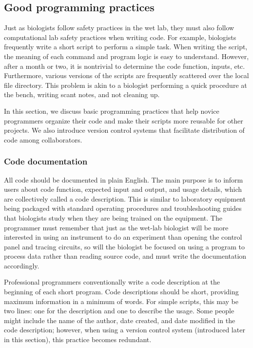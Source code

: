 \documentclass[ChapterTOCs,krantz2]{krantz} %
\begin{document}
\subsection{Good programming practices}

Just as biologists follow safety practices in the wet lab, they
must also follow computational lab safety practices when writing code.
For example, biologists frequently write a short script to perform a 
simple task. When writing the script, the 
meaning of each command and program logic 
is easy to understand.  However, after a month or two, it is 
nontrivial to determine the code function, inputs, etc.
Furthermore, various versions of the scripts are frequently scattered 
over the local file directory. This problem is akin to a biologist performing a
quick procedure at the bench, writing scant notes, and not cleaning up. 

In this section, we discuss basic programming
practices that help novice programmers organize their code and make their
scripts more reusable for other projects. We also introduce version control 
systems that facilitate
distribution of code among collaborators.


\subsubsection{Code documentation} 
All code should be documented in plain English.  
The main purpose is to inform users about code function, expected input
and output, and usage details, which are collectively called
a code description. This is
similar to laboratory equipment being packaged with standard operating
procedures and troubleshooting guides that biologists study when they are 
being trained on the equipment.  The programmer must remember that just as the
wet-lab biologist will be more interested in using an instrument to do an
experiment than opening the control panel and tracing circuits, so will the
biologist be focused on using a program to process data rather than reading
source code, and must write the documentation accordingly. 

Professional programmers conventionally write a code description at the
beginning of each short program.  Code descriptions should be short, 
providing maximum information in a
minimum of words.  For simple scripts, this may be two lines: one for the
description and one to describe the usage.  Some people might include the
name of the author, date created, and date modified in the code description;
however, when using a version control system (introduced later in this
section), this practice becomes redundant.  
\end{document}
